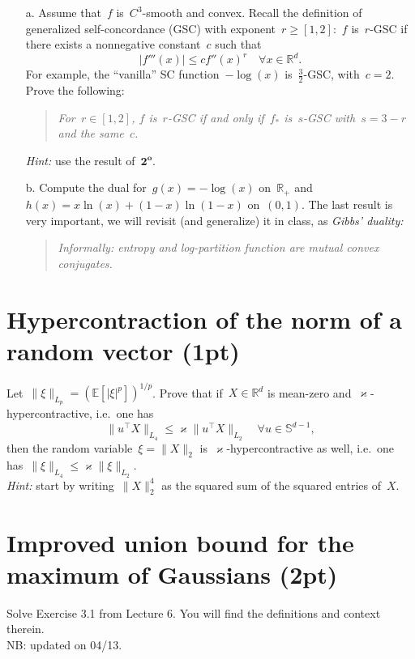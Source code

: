 \documentclass[11pt]{article}
\newcommand{\proofstep}[1]{$\boldsymbol{{#1}^o}$}
\newcommand{\odima}[1]{{\color{red} #1}}
\newcommand{\R}{\mathds{R}}
\newcommand{\E}{\mathds{E}}
\newcommand{\leqs}{\leqslant}
\newcommand{\geqs}{\geqslant}
\renewcommand{\le}{\leqs}
\renewcommand{\ge}{\geqs}
\begin{document}
\begin{itemize}
\item[a.]
Assume that~$f$ is~$C^3$-smooth and convex.
Recall the definition of generalized self-concordance (GSC) with exponent~$r \ge [1,2]$:~$f$ is~$r$-GSC if there exists a nonnegative constant~$c$ such that
\[
|f'''(x)| \le c f''(x)^r \quad \forall x \in \R^d.
\]
For example, the ``vanilla'' SC function~$-\log(x)$ is~$\frac{3}{2}$-GSC, with~$c = 2$. 
Prove the following: 
\begin{quote}
{\em For~$r \in [1,2]$, $f$ is~$r$-GSC if and only if~$f_*$ is~$s$-GSC with~$s = 3-r$ and the same~$c$.}
\end{quote}
{\em Hint:} use the result of~\proofstep{2}.

\item[b.]
Compute the dual for~$g(x) = -\log(x)$ on~$\R_+$ and~$h(x) = x\ln(x) + (1-x)\ln(1-x)$ on~$(0,1)$.
The last result is very important, we will revisit (and generalize) it in class, as {\em Gibbs' duality:}

\begin{quote}
\em 
Informally: entropy and log-partition function are mutual convex conjugates.
\em
\end{quote}

\end{itemize}


\newpage
\section{Hypercontraction of the norm of a random vector (1pt)}
Let~$\|\xi\|_{L_p} = (\E[|\xi|^p])^{1/p}$. Prove that if~$X \in \R^d$ is \odima{mean-zero} and~$\varkappa$-hypercontractive, i.e.~one has
\[
\| u^\top X \|_{L_4} \le \varkappa \| u^\top X \|_{L_2} \quad \forall u \in \mathbb{S}^{d-1},
\]
then the random variable~$\xi = \| X \|_2$ is~$\varkappa$-hypercontractive as well, i.e.~one has~$\| \xi \|_{L_4} \le \varkappa \| \xi \|_{L_2}$.\\
{\em Hint:} start by writing~$\|X\|_{2}^4$ as the squared sum of the squared entries of~$X$.


\newpage
\section{Improved union bound for the maximum of Gaussians (2pt)}

Solve Exercise 3.1 from Lecture 6. You will find the definitions and context therein.\\
\odima{NB: updated on 04/13.}
\end{document}

